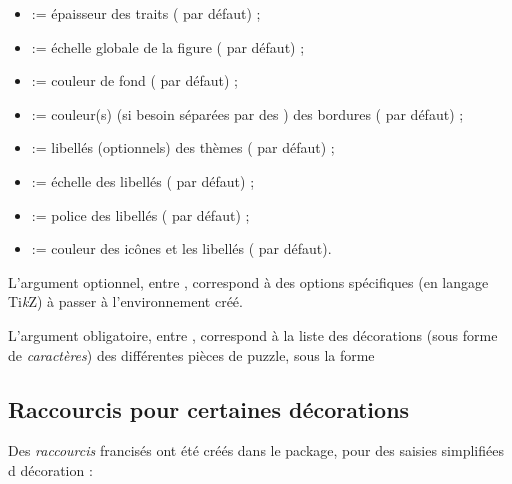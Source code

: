\documentclass[11pt,a4paper]{ltxdoc}
\providecommand\tikzlogo{Ti\textit{k}Z}
\let\TikZ\tikzlogo
\begin{document}
\begin{itemize}
	\item {} := épaisseur des traits (\MontreCode{1pt} par défaut) ;
	\item {} := échelle globale de la figure ( par défaut) ;
	\item {} := couleur de fond ( par défaut) ;
	\item {} := couleur(s) (si besoin séparées par des \MontreCode{,}) des bordures ( par défaut) ;
	\item {} := libellés (optionnels) des thèmes ( par défaut) ;
	\item {} := échelle des libellés ( par défaut) ;
	\item {} := police des libellés ( par défaut) ;
	\item {} := couleur des icônes et les libellés ( par défaut).
\end{itemize}

\medskip

L'argument optionnel, entre , correspond à des options spécifiques (en langage \TikZ) à passer à l'environnement créé.

\smallskip

L'argument obligatoire, entre , correspond à la liste des décorations (sous forme de \textit{caractères}) des différentes pièces de puzzle, sous la forme 

\subsection{Raccourcis pour certaines décorations}

Des \textit{raccourcis} francisés ont été créés dans le package, pour des saisies simplifiées d décoration :
\end{document}
